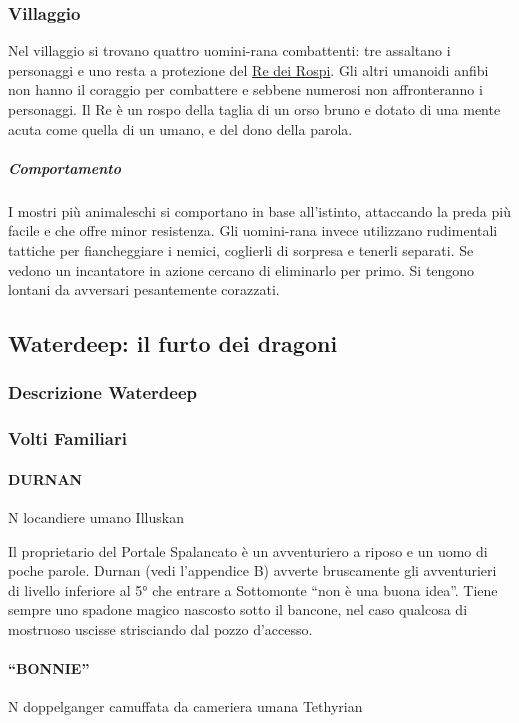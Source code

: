 \documentclass{article}
\begin{document}
\subsubsection{Villaggio}
Nel villaggio si trovano quattro uomini-rana combattenti: tre assaltano i personaggi e uno resta a protezione del \hyperlink{re}{Re dei Rospi}. Gli altri umanoidi anfibi non hanno il coraggio per combattere e sebbene numerosi non affronteranno i personaggi. Il Re è un rospo della taglia di un orso bruno e dotato di una mente acuta come quella di un umano, e del dono della parola.
\subparagraph{Comportamento}
I mostri più animaleschi si comportano in base all’istinto, attaccando la preda più facile e che offre minor resistenza. Gli uomini-rana invece utilizzano rudimentali tattiche per fiancheggiare i nemici, coglierli di sorpresa e tenerli separati. Se vedono un incantatore in azione cercano di eliminarlo per primo. Si tengono lontani da avversari pesantemente corazzati.





\subsection{Waterdeep: il furto dei dragoni}
\subsubsection{Descrizione Waterdeep} 

\subsubsection{Volti Familiari}

\paragraph{DURNAN}
N locandiere umano Illuskan

Il proprietario del Portale Spalancato è un avventuriero a riposo e un uomo di poche parole. Durnan (vedi l'appendice B) avverte bruscamente gli avventurieri di livello inferiore al 5° che entrare a Sottomonte “non è una buona idea”. Tiene sempre uno spadone magico nascosto sotto il bancone, nel caso qualcosa di mostruoso uscisse strisciando dal pozzo d'accesso.

\paragraph{“BONNIE”}
N doppelganger camuffata da cameriera umana Tethyrian
\end{document}
